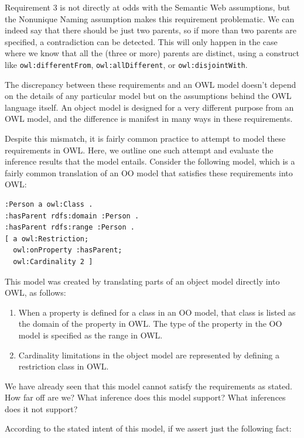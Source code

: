 Requirement 3 is not directly at odds with the Semantic Web assumptions,
but the Nonunique Naming assumption makes this requirement problematic.
We can indeed say that there should be just two parents, so if more than
two parents are specified, a contradiction can be detected. This will
only happen in the case where we know that all the (three or more)
parents are distinct, using a construct like \texttt{owl:differentFrom},
\texttt{owl:allDifferent}, or \texttt{owl:disjointWith}.

The discrepancy between these requirements and an OWL model doesn't
depend on the details of
any particular model but on the assumptions behind the OWL language
itself. An object model is designed for a very different purpose from an
OWL model, and the difference is manifest in many ways in these
requirements.

Despite this mismatch, it is fairly common practice to attempt to model
these requirements in OWL. Here, we outline one such attempt and
evaluate the inference results that the model entails. Consider the
following model, which is a fairly common translation of an OO model
that satisfies these requirements into OWL:

\begin{lstlisting}
:Person a owl:Class .
:hasParent rdfs:domain :Person .
:hasParent rdfs:range :Person .
[ a owl:Restriction;
  owl:onProperty :hasParent;
  owl:Cardinality 2 ]
\end{lstlisting}

This model was created by translating parts of an object model directly
into OWL, as follows:

\begin{enumerate}
\item When a property is defined for a class in an OO model, that class is
listed as the domain of the property in OWL. The type of the property in
the OO model is specified as the range in OWL.

\item Cardinality limitations in the object model are represented by
defining a restriction class in OWL.
\end{enumerate}

We have already seen that this model cannot satisfy the requirements as
stated. How far off are we? What inference does this model support? What
inferences does it not support?

According to the stated intent of this model, if we assert just the
following fact:

